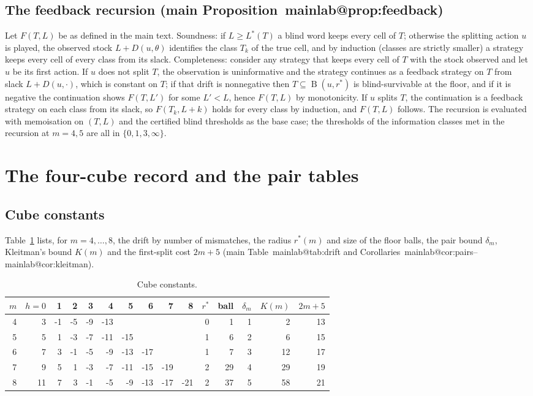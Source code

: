 \documentclass[11pt,a4paper]{article}
\makeatletter
\theoremstyle{plain}
\theoremstyle{definition}
\theoremstyle{remark}
\newcommand{\Ball}{\operatorname{B}}
\newcommand{\Lstar}{L^{\ast}}
\newcommand{\mref}[1]{\csname mainlab@#1\endcsname}
\makeatother
\begin{document}
\subsection{The feedback recursion (main Proposition~\mref{prop:feedback})}
Let $F(T,L)$ be as defined in the main text. Soundness: if $L\ge\Lstar(T)$ a blind word keeps every cell of $T$; otherwise the splitting action $u$ is played, the observed stock $L+D(u,\theta)$ identifies the class $T_k$ of the true cell, and by induction (classes are strictly smaller) a strategy keeps every cell of every class from its slack. Completeness: consider any strategy that keeps every cell of $T$ with the stock observed and let $u$ be its first action. If $u$ does not split $T$, the observation is uninformative and the strategy continues as a feedback strategy on $T$ from slack $L+D(u,\cdot)$, which is constant on $T$; if that drift is nonnegative then $T\subseteq\Ball(u,r^\ast)$ is blind-survivable at the floor, and if it is negative the continuation shows $F(T,L')$ for some $L'<L$, hence $F(T,L)$ by monotonicity. If $u$ splits $T$, the continuation is a feedback strategy on each class from its slack, so $F(T_k,L+k)$ holds for every class by induction, and $F(T,L)$ follows. The recursion is evaluated with memoisation on $(T,L)$ and the certified blind thresholds as the base case; the thresholds of the information classes met in the recursion at $m=4,5$ are all in $\{0,1,3,\infty\}$.
\section{The four-cube record and the pair tables}\label{S:four}

\subsection{Cube constants}
Table~\ref{tab:S2cube} lists, for $m=4,\dots,8$, the drift by number of mismatches, the radius $r^\ast(m)$ and size of the floor balls, the pair bound $\delta_m$, Kleitman's bound $K(m)$ and the first-split cost $2m+5$ (main Table~\mref{tab:drift} and Corollaries~\mref{cor:pairs}--\mref{cor:kleitman}).
\begin{table}[H]\centering\small
\caption{Cube constants.}\label{tab:S2cube}
\begin{tabular}{rrrrrrrrrr|rrrrr}
\toprule
$m$ & $h{=}0$ & 1 & 2 & 3 & 4 & 5 & 6 & 7 & 8 & $r^\ast$ & ball & $\delta_m$ & $K(m)$ & $2m+5$\\
\midrule
4 & 3 & -1 & -5 & -9 & -13 &  &  &  &  & 0 & 1 & 1 & 2 & 13\\
5 & 5 & 1 & -3 & -7 & -11 & -15 &  &  &  & 1 & 6 & 2 & 6 & 15\\
6 & 7 & 3 & -1 & -5 & -9 & -13 & -17 &  &  & 1 & 7 & 3 & 12 & 17\\
7 & 9 & 5 & 1 & -3 & -7 & -11 & -15 & -19 &  & 2 & 29 & 4 & 29 & 19\\
8 & 11 & 7 & 3 & -1 & -5 & -9 & -13 & -17 & -21 & 2 & 37 & 5 & 58 & 21\\
\bottomrule
\end{tabular}
\end{table}
\end{document}
